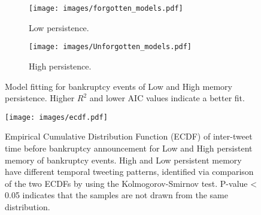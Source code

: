 \documentclass[9pt,twocolumn,twoside,lineno]{pnas-new}
\begin{document}
\begin{figure*}[htbp]
  \centering
  \begin{subfigure}[b]{0.45\textwidth}
    \texttt{[image: images/forgotten\_models.pdf]}
    \caption{Low persistence.}
    \label{fig:sub1}
  \end{subfigure}
  \hfill
  \begin{subfigure}[b]{0.45\textwidth}
    \texttt{[image: images/Unforgotten\_models.pdf]}
    \caption{High persistence.}
    \label{fig:sub2}
  \end{subfigure}
  \caption{
            Model fitting for bankruptcy events of Low and High memory persistence.
            Higher $R^2$ and lower AIC values indicate a better fit.
  }
  \label{fig:models}
\end{figure*}


\newpage

\begin{figure}[h!]
\center
    \texttt{[image: images/ecdf.pdf]}
    \caption{ 
           Empirical Cumulative Distribution Function (ECDF) of inter-tweet time before bankruptcy announcement for Low and High persistent memory of bankruptcy events.
           High and Low persistent memory have different temporal tweeting patterns, identified via comparison of the two ECDFs by using the Kolmogorov-Smirnov test.
           P-value < 0.05 indicates that the samples are not drawn from the same distribution.
            }
    \label{fig:ecdf}
\end{figure}


\newpage
\end{document}
